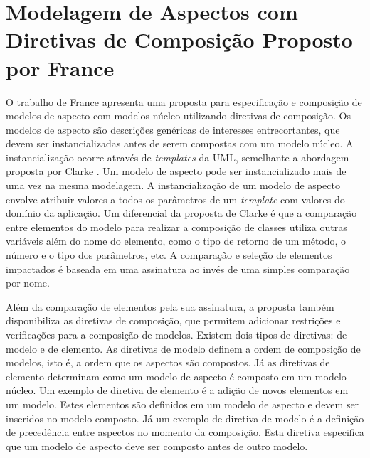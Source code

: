 \section{Modelagem de Aspectos com Diretivas de Composição Proposto por France}

O trabalho de France \cite{france:06} \cite{FranceReddy} apresenta uma proposta para especificação e composição de modelos de aspecto com modelos
núcleo utilizando diretivas de composição. Os modelos de aspecto são descrições genéricas de interesses entrecortantes, que devem ser instancializadas antes de serem
compostas com um modelo núcleo. A instancialização ocorre através de \textit{templates} da UML, semelhante a abordagem proposta por Clarke
\cite{clarke:04}. Um modelo de aspecto pode ser instancializado mais de uma vez na mesma modelagem. A instancialização de um modelo de aspecto envolve 
atribuir valores a todos os parâmetros de um \textit{template} com valores do domínio da aplicação. Um diferencial da proposta de Clarke é que a
comparação entre elementos do modelo para realizar a composição de classes utiliza outras variáveis além do nome do elemento, como o tipo de retorno
de um método, o número e o tipo dos parâmetros, etc. A comparação e seleção de elementos impactados é baseada em uma assinatura ao invés de uma
simples comparação por nome.

Além da comparação de elementos pela sua assinatura, a proposta também disponibiliza as diretivas de composição, que permitem adicionar restrições e
verificações para a composição de modelos. Existem dois tipos de diretivas: de modelo e de elemento. As diretivas de modelo definem a ordem de
composição de modelos, isto é, a ordem que os aspectos são compostos. Já as diretivas de elemento determinam como um modelo de aspecto é composto em
um modelo núcleo. Um exemplo de diretiva de elemento é a adição de novos elementos em um modelo. Estes elementos são definidos em um modelo de aspecto
e devem ser inseridos no modelo composto. Já um exemplo de diretiva de modelo é a definição de precedência entre aspectos no momento da composição.
Esta diretiva especifica que um modelo de aspecto deve ser composto antes de outro modelo.

